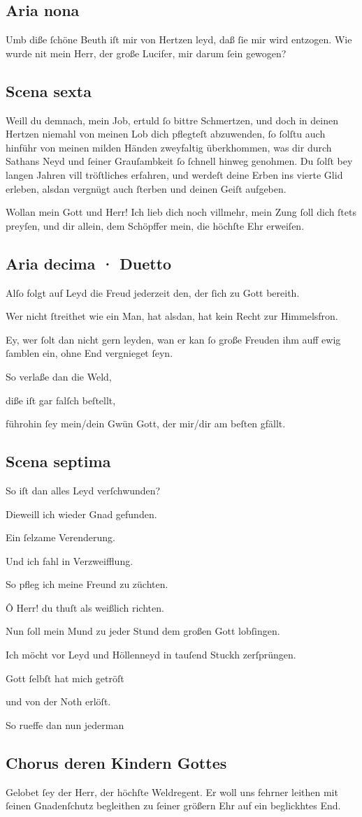 \documentclass{ees}
\newenvironment{lyrics}[1]{%
  \subsection{#1}\nopagebreak%
  \begin{lyricslist}%
  \let\voice\item%
}{%
  \end{lyricslist}%
}
\begin{document}
\begin{lyrics}{Aria nona}
  \voice[Leviathan]
  Umb diße ſchöne Beuth
  iſt mir von Hertzen leyd,
  daß ſie mir wird entzogen.
  Wie wurde nit mein Herr,
  der große Lucifer,
  mir darum ſein gewogen?
\end{lyrics}

\begin{lyrics}{Scena sexta}
  \voice[Schöpffer]
  Weill du demnach, mein Job,
  ertuld ſo bittre Schmertzen,
  und doch in deinen Hertzen
  niemahl von meinen Lob
  dich pflegteſt abzuwenden,
  ſo ſolſtu auch hinführ
  von meinen milden Händen
  zweyfaltig überkhommen,
  was dir durch Sathans Neyd
  und ſeiner Grauſambkeit
  ſo ſchnell hinweg genohmen.
  Du ſolſt bey langen Jahren
  vill tröſtliches erfahren,
  und werdeſt deine Erben
  ins vierte Glid erleben,
  alsdan vergnügt auch ſterben
  und deinen Geiſt aufgeben.

  \voice[Job]
  Wollan mein Gott und Herr!
  Ich lieb dich noch villmehr,
  mein Zung ſoll dich ſtets preyſen,
  und dir allein,
  dem Schöpffer mein,
  die höchſte Ehr erweiſen.
\end{lyrics}

\begin{lyrics}{Aria decima · Duetto}
  \voice[Job]
  Alſo folgt auf Leyd die Freud
  jederzeit
  den, der ſich zu Gott bereith.

  \voice[Schöpffer]
  Wer nicht ſtreithet wie ein Man,
  hat alsdan,
  hat kein Recht zur Himmelsfron.

  \voice[beyde]
  Ey, wer ſolt dan nicht gern leyden,
  wan er kan ſo große Freuden
  ihm auff ewig ſamblen ein,
  ohne End vergnieget ſeyn.

  \voice[Schöpffer]
  So verlaße dan die Weld,

  \voice[Job]
  diße iſt gar falſch beſtellt,

  \voice[beyde]
  führohin
  ſey mein/dein Gwün
  Gott, der mir/dir am beſten gfällt.
\end{lyrics}

\begin{lyrics}{Scena septima}
  \voice[Jobs Frau]
  So iſt dan alles Leyd verſchwunden?

  \voice[Job]
  Dieweill ich wieder Gnad gefunden.

  \voice[Eliphas]
  Ein ſelzame Verenderung.

  \voice[Leviathan]
  Und ich fahl in Verzweifflung.

  \voice[Schöpffer]
  So pfleg ich meine Freund zu züchten.

  \voice[Job]
  Ô Herr! du thuſt als weißlich richten.

  \voice[Jobs Frau]
  Nun ſoll mein Mund
  zu jeder Stund
  dem großen Gott lobſingen.

  \voice[Leviathan]
  Ich möcht vor Leyd
  und Höllenneyd
  in tauſend Stuckh zerſprüngen.

  \voice[Job]
  Gott ſelbſt hat mich getröſt

  \voice[Eliphas]
  und von der Noth erlöſt.

  \voice[Jobs Frau]
  So rueffe dan
  nun jederman
\end{lyrics}

\begin{lyrics}{Chorus deren Kindern Gottes}
  \voice[Die Kinder Gottes]
  Gelobet ſey der Herr,
  der höchſte Weldregent.
  Er woll uns fehrner leithen
  mit ſeinen Gnadenſchutz begleithen
  zu ſeiner größern Ehr
  auf ein beglickhtes End.
\end{lyrics}
\end{document}
